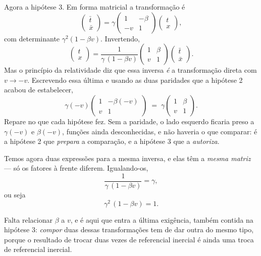 \documentclass[12pt,a4paper,oneside]{book}
\theoremstyle{rgplain}
\theoremstyle{rgremark}
\begin{document}
\begin{resultado}
Agora a hipótese 3. Em forma matricial a transformação é
\[
  \begin{pmatrix}\bar t\\ \bar x\end{pmatrix}
  =\gamma\begin{pmatrix}1&-\beta\\-v&1\end{pmatrix}
  \begin{pmatrix}t\\x\end{pmatrix},
\]
com determinante $\gamma^2(1-\beta v)$. Invertendo,
\[
  \begin{pmatrix}t\\x\end{pmatrix}
  =\frac{1}{\gamma\,(1-\beta v)}
  \begin{pmatrix}1&\beta\\v&1\end{pmatrix}
  \begin{pmatrix}\bar t\\ \bar x\end{pmatrix}.
\]
Mas o princípio da relatividade diz que essa inversa \emph{é} a transformação
direta com $v\to-v$. Escrevendo essa última e usando as duas paridades que a
hipótese 2 acabou de estabelecer,
\[
  \gamma(-v)\begin{pmatrix}1&-\beta(-v)\\ v&1\end{pmatrix}
  \;=\;
  \gamma\begin{pmatrix}1&\beta\\ v&1\end{pmatrix}.
\]
Repare no que cada hipótese fez. Sem a paridade, o lado esquerdo ficaria preso a
$\gamma(-v)$ e $\beta(-v)$, funções ainda desconhecidas, e não haveria o que
comparar: é a hipótese 2 que \emph{prepara} a comparação, e a hipótese 3 que a
\emph{autoriza}.

Temos agora duas expressões para a mesma inversa, e elas têm a \emph{mesma
matriz} --- só os fatores à frente diferem. Igualando-os,
\[
  \frac{1}{\gamma\,(1-\beta v)}=\gamma,
\]
ou seja
\begin{equation}
  \gamma^2\,(1-\beta v)=1 .
  \label{eq:ignatowski-gamma}
\end{equation}

Falta relacionar $\beta$ a $v$, e é aqui que entra a última exigência, também
contida na hipótese 3: \emph{compor} duas dessas transformações tem de dar
outra do mesmo tipo, porque o resultado de trocar duas vezes de referencial
inercial é ainda uma troca de referencial inercial.


\end{resultado}
\end{document}
